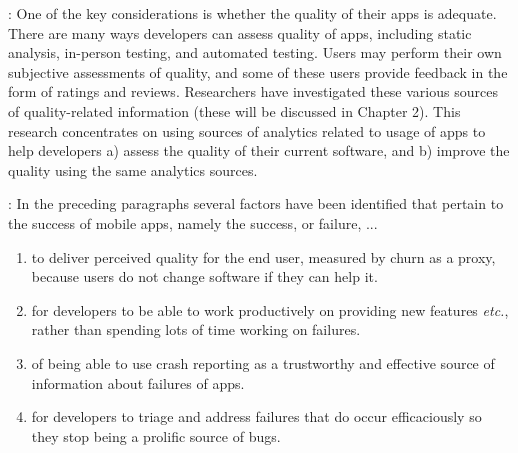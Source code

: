 
\medskip
{}: One of the key considerations is whether the quality of their apps is adequate. There are many ways developers can assess quality of apps, including static analysis, in-person testing, and automated testing. Users may perform their own subjective assessments of quality, and some of these users provide feedback in the form of ratings and reviews. Researchers have investigated these various sources of quality-related information (these will be discussed in Chapter 2). This research concentrates on using sources of analytics related to usage of apps to help developers a) assess the quality of their current software, and b) improve the quality using the same analytics sources.


\medskip
{}: %
In the preceding paragraphs several factors have been identified that pertain to the success of mobile apps, namely the success, or failure, ...
\begin{enumerate}
    \itemsep0em
    \item to deliver perceived quality for the end user, measured by churn as a proxy, because users do not change software if they can help it. %
    \item for developers to be able to work productively on providing new features \emph{etc.}, rather than spending lots of time working on failures.
    \item of being able to use crash reporting as a trustworthy and effective source of information about failures of apps.
    \item for developers to triage and address failures that do occur efficaciously so they stop being a prolific source of bugs.
\end{enumerate}


